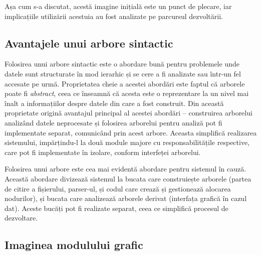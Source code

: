 \documentclass[a4paper,12pt]{report}
\begin{document}
Așa cum s-a discutat, acestă imagine inițială este un punct de plecare,
iar implicațiile utilizării acestuia au fost analizate pe parcursul dezvoltării.

\subsection{Avantajele unui arbore sintactic}

Folosirea unui arbore sintactic este o abordare bună pentru problemele 
unde datele sunt structurate în mod ierarhic și se cere a fi analizate sau într-un fel accesate pe urmă.
Proprietatea cheie a acestei abordări este faptul că arborele poate fi \textit{abstract},
ceea ce înseamnă că acesta este o reprezentare la un nivel mai înalt a informațiilor despre datele
din care a fost construit.
Din această proprietate origină avantajul principal al acestei abordări --
construirea arborelui analizând datele neprocesate și folosirea arborelui
pentru analiză pot fi implementate separat, comunicând prin acest arbore.
Aceasta simplifică realizarea sistemului, impărțindu-l la două module majore cu responsabilitățile respective,
care pot fi implementate în izolare, conform interfeței arborelui.

Folosirea unui arbore este cea mai evidentă abordare pentru sistemul în cauză.
Această abordare divizează sistemul la bucata care construiește arborele
(partea de citire a fișierului, parser-ul, și codul care crează și gestionează alocarea nodurilor),
și bucata care analizează arborele derivat (interfața grafică în cazul dat).
Aceste bucăți pot fi realizate separat, ceea ce simplifică procesul de dezvoltare.

\subsection{Imaginea modulului grafic}
\end{document}
